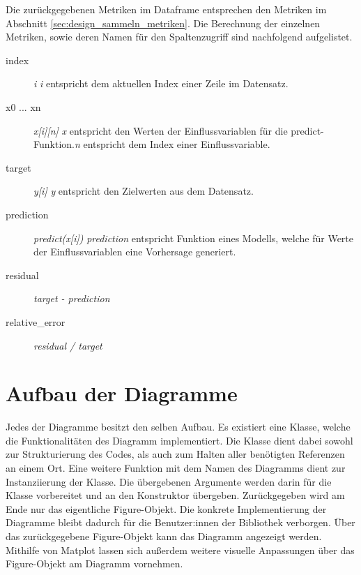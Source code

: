 \noindent Die zurückgegebenen Metriken im Dataframe entsprechen den Metriken im Abschnitt \ref{sec:design_sammeln_metriken}. Die Berechnung der einzelnen Metriken, sowie deren Namen für den Spaltenzugriff sind nachfolgend aufgelistet.

\pagebreak

\begin{description}
\item[index] \emph{i}\hfill\newline
\emph{i} entspricht dem aktuellen Index einer Zeile im Datensatz.
\item[x0 ... xn] \emph{x[i][n]}\hfill\newline
\emph{x} entspricht den Werten der Einflussvariablen für die predict-Funktion.\newline \emph{n} entspricht dem Index einer Einflussvariable.
\item[target] \emph{y[i]}\hfill\newline
\emph{y} entspricht den Zielwerten aus dem Datensatz.
\item[prediction] \emph{predict(x[i])} \hfill\newline
\emph{prediction} entspricht Funktion eines Modells, welche für Werte der Einflussvariablen eine Vorhersage generiert.
\item[residual] \emph{target - prediction}\hfill
\item[relative\_error] \emph{residual / target}\hfill
\end{description}

\section{Aufbau der Diagramme}
\label{sec:design_aufbau_diagramme}

Jedes der Diagramme besitzt den selben Aufbau. Es existiert eine Klasse, welche die Funktionalitäten des Diagramm implementiert. Die Klasse dient dabei sowohl zur Strukturierung des Codes, als auch zum Halten aller benötigten Referenzen an einem Ort. Eine weitere Funktion mit dem Namen des Diagramms dient zur Instanziierung der Klasse. Die übergebenen Argumente werden darin für die Klasse vorbereitet und an den Konstruktor übergeben. Zurückgegeben wird am Ende nur das eigentliche Figure-Objekt. Die konkrete Implementierung der Diagramme bleibt dadurch für die Benutzer:innen der Bibliothek verborgen. Über das zurückgegebene Figure-Objekt kann das Diagramm angezeigt werden. Mithilfe von Matplot lassen sich außerdem weitere visuelle Anpassungen über das Figure-Objekt am Diagramm vornehmen.

